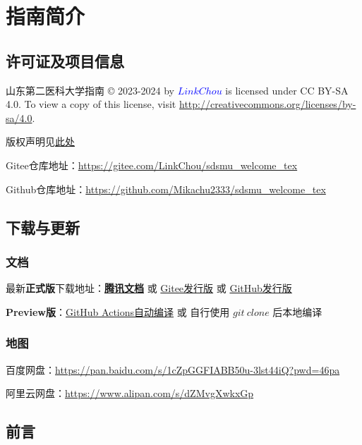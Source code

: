 \chapter[指南简介]{指南简介}

\section[许可证及项目信息]{许可证及项目信息}
山东第二医科大学指南 © 2023-2024 by \textcolor{blue}{$LinkChou$} is licensed under CC BY-SA 4.0. To view a copy of this license, visit \href{http://creativecommons.org/licenses/by-sa/4.0}{http://creativecommons.org/licenses/by-sa/4.0}.

版权声明见\hyperref[copyright]{此处}

Gitee仓库地址：\href{https://gitee.com/LinkChou/sdsmu_welcome_tex}{https://gitee.com/LinkChou/sdsmu\_welcome\_tex}

Github仓库地址：\href{https://github.com/Mikachu2333/sdsmu_welcome_tex}{https://github.com/Mikachu2333/sdsmu\_welcome\_tex}

\section[\textcolor{red}{下载与更新}]{下载与更新}
\subsection{文档}
最新\textbf{正式版}下载地址：\textbf{\textcolor{red}{\href{https://docs.qq.com/s/ETcQ-ZFSrSsh6MK9bm773q}{腾讯文档}}} 或 \href{https://gitee.com/LinkChou/sdsmu_welcome_tex/releases/latest}{Gitee发行版} 或 \href{https://github.com/mikachu2333/sdsmu_welcome_tex/releases/latest}{GitHub发行版}

\textbf{Preview版}\footnotemark：\href{https://github.com/Mikachu2333/sdsmu_welcome_tex/actions}{GitHub Actions自动编译} 或 自行使用 $git\ clone$ 后本地编译

\subsection[地图]{地图}
百度网盘：\href{https://pan.baidu.com/s/1cZpGGFIABB50u-3lst44iQ?pwd=46pa}{https://pan.baidu.com/s/1cZpGGFIABB50u-3lst44iQ?pwd=46pa}

阿里云网盘：\href{https://www.alipan.com/s/dZMvgXwkxGp}{https://www.alipan.com/s/dZMvgXwkxGp}

\section[前言]{前言}
